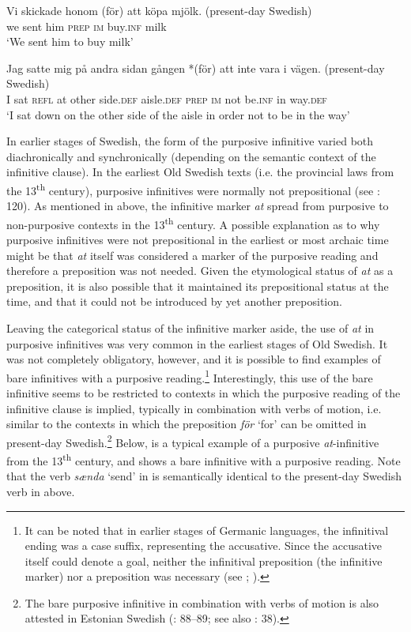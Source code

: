 \documentclass[output=paper]{langscibook}
\begin{document}
\ea
\label{ex:kalm:8}
\ea \label{ex:kalm:8a}
\gll Vi skickade honom (för) att köpa mjölk. (present-day Swedish)\\
we sent him \textsc{prep} \textsc{im} buy.\textsc{inf} milk\\
\glt ‘We sent him to buy milk’

\ex  \label{ex:kalm:8b}
\gll Jag satte mig på andra sidan gången *(för) att inte vara i vägen. (present-day Swedish)\\
 I sat \textsc{refl} at other side.\textsc{def} aisle.\textsc{def} \textsc{prep} \textsc{im} not be.\textsc{inf} in way.\textsc{def}\\
\glt ‘I sat down on the other side of the aisle in order not to be in the way’
\z 
\z 


In earlier stages of Swedish, the form of the purposive infinitive varied both diachronically and synchronically (depending on the semantic context of the infinitive clause). In the earliest Old Swedish texts (i.e. the provincial laws from the 13\textsuperscript{th} century), purposive infinitives were normally not prepositional (see \citealt{Kalm2016Satsekvivalenta}: 120). As mentioned in  above, the infinitive marker \textit{at} spread from purposive to non-purposive contexts in the 13\textsuperscript{th} century. A possible explanation as to why purposive infinitives were not prepositional in the earliest or most archaic time might be that \textit{at} itself was considered a marker of the purposive reading and therefore a preposition was not needed. Given the etymological status of \textit{at} as a preposition, it is also possible that it maintained its prepositional status at the time, and that it could not be introduced by yet another preposition. 



Leaving the categorical status of the infinitive marker aside, the use of \textit{at} in purposive infinitives was very common in the earliest stages of Old Swedish. It was not completely obligatory, however, and it is possible to find examples of bare infinitives with a purposive reading.\footnote{It can be noted that in earlier stages of Germanic languages, the infinitival ending was a case suffix, representing the accusative. Since the accusative itself could denote a goal, neither the infinitival preposition (the infinitive marker) nor a preposition was necessary (see \citealt{Haspelmath1989}; \citealt{Jeffers1975}).} Interestingly, this use of the bare infinitive seems to be restricted to contexts in which the purposive reading of the infinitive clause is implied, typically in combination with verbs of motion, i.e. similar to the contexts in which the preposition \textit{för} ‘for’ can be omitted in present-day Swedish.\footnote{The bare purposive infinitive in combination with verbs of motion is also attested in Estonian Swedish (\citealt{Lagman1958}: 88–89; see also \citealt{Jorgensen1970}: 38).}  Below,  is a typical example of a purposive \textit{at}-infinitive from the 13\textsuperscript{th} century, and  shows a bare infinitive with a purposive reading. Note that the verb \textit{sænda} ‘send’ in  is semantically identical to the present-day Swedish verb in  above. 
\end{document}
